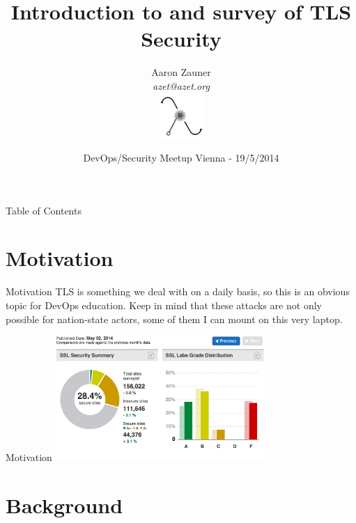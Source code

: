 \documentclass[hyperref={draft}]{beamer}
\title{Introduction to and survey of TLS Security}
\author[Aaron Zauner]{Aaron Zauner\\
	      \textit{azet@azet.org}\\
	      \includegraphics[height=65px,width=65px]{lambda}
       }
\institute{lambda.co.at:\\Highly-Available, Scalable \& Secure Distributed Systems}
\date{DevOps/Security Meetup Vienna - 19/5/2014}
\begin{document}
{

\begin{frame}
  \titlepage
\end{frame}

}
\addtocounter{framenumber}{-1}

{

\begin{frame}{Table of Contents}
  \tableofcontents
\end{frame}

}
\addtocounter{framenumber}{-1}




\section{Motivation}

\begin{frame}{Motivation}
  TLS is something we deal with on a daily basis, so this is an obvious topic for DevOps education.
  \newline
  \newline
  Keep in mind that these attacks are not only possible for nation-state actors, some of them I can mount on this very laptop.
\end{frame}

\begin{frame}{Motivation}
    \includegraphics[height=180px]{sslpulse}
\end{frame}


\section{Background}
\end{document}
